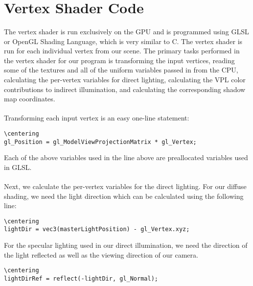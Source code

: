 \section{Vertex Shader Code}
\paragraph{}
The vertex shader is run exclusively on the GPU and is programmed using GLSL or OpenGL Shading Language, which is very similar to C.  The vertex shader is run for each individual vertex from our scene.  The primary tasks performed in the vertex shader for our program is transforming the input vertices, reading some of the textures and all of the uniform variables passed in from the CPU, calculating the per-vertex variables for direct lighting, calculating the VPL color contributions to indirect illumination, and calculating the corresponding shadow map coordinates.

\paragraph{}
Transforming each input vertex is an easy one-line statement:

\begin{lstlisting}
\centering
gl_Position = gl_ModelViewProjectionMatrix * gl_Vertex;
\end{lstlisting}

Each of the above variables used in the line above are preallocated variables used in GLSL.

\paragraph{}
Next, we calculate the per-vertex variables for the direct lighting.  For our diffuse shading, we need the light direction which can be calculated using the following line:

\begin{lstlisting}
\centering
lightDir = vec3(masterLightPosition) - gl_Vertex.xyz;
\end{lstlisting}

For the specular lighting used in our direct illumination, we need the direction of the light reflected as well as the viewing direction of our camera.

\begin{lstlisting}
\centering
lightDirRef = reflect(-lightDir, gl_Normal);
\end{lstlisting}

